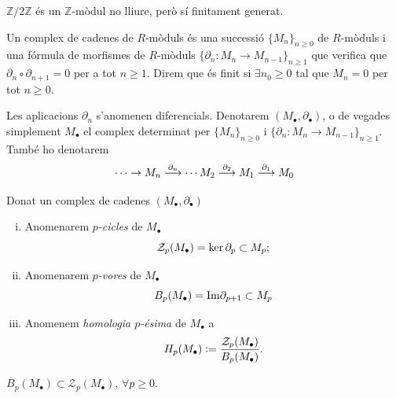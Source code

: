 \documentclass[../main.tex]{subfiles}
\begin{document}
\begin{ej}
$\mathbb{Z}/2\mathbb{Z}$ és un $\mathbb{Z}$-mòdul no lliure, però sí finitament generat.
\end{ej}

\begin{defi} Un complex de cadenes de $R$-mòduls és una successió $\{M_n\}_{n\geq 0}$ de $R$-mòduls i una fórmula de morfismes de $R$-mòduls $\{\partial_n:M_n\rightarrow M_{n-1}\}_{n\geq 1}$ que verifica que $\partial_n\circ\partial_{n+1}=0$ per a tot $n\geq 1$. Direm que és finit si $\exists n_0\geq 0$ tal que $M_n = 0$ per tot $n\geq 0$.
\end{defi}


Les aplicacions $\partial_n$ s'anomenen diferencials. Denotarem $(M_\bullet,\partial_\bullet)$, o de vegades simplement $M_\bullet$ el complex determinat per $\{M_n\}_{n\geq 0}$ i $\{\partial_n:M_n\rightarrow M_{n-1}\}_{n\geq 1}$. També ho denotarem
\begin{equation}
    \notag
    \cdots\rightarrow M_n\overset{\partial_n}{\longrightarrow} \cdots M_2\overset{\partial_2}{\longrightarrow}M_1\overset{\partial_1}{\longrightarrow}M_0
\end{equation}

\begin{defi}
Donat un complex de cadenes $(M_\bullet,\partial_\bullet)$
\begin{enumerate}[(i)]
    \item Anomenarem \textit{$p$-cicles} de $M_\bullet$
    \begin{equation}
        \notag
        \mathcal{Z}_p(M_\bullet) = \ker\partial_p\subset M_p;
    \end{equation}
    \item Anomenarem \textit{$p$-vores} de $M_\bullet$
    \begin{equation}
        \notag
        B_p(M_\bullet) =\mathrm{Im}\partial_{p+1}\subset M_p
    \end{equation}
    \item Anomenem \textit{homologia $p$-ésima} de $M_\bullet$ a 
    \begin{equation}
        \notag
        H_p(M_\bullet) := \frac{\mathcal{Z}_p(M_\bullet)}{B_p(M_\bullet)}.
    \end{equation}
\end{enumerate}
\end{defi}

\begin{nota}
$B_p(M_\bullet)\subset\mathcal{Z}_p(M_\bullet)$, $\forall p\geq 0$.
\end{nota}
\end{document}
